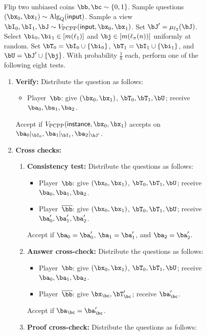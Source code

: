 \documentclass[11pt]{article}
\begin{document}
{
	\begin{figure}Flip two unbiased coins $\bb, \bc \sim \{0, 1\}$. 
    		Sample questions $(\bx_0, \bx_1) \sim \mathrm{Alg}_{\mathrm{Q}}(\mathsf{input})$.
		Sample a view $\bI_0, \bI_1, \bJ \sim V_{\mathrm{PCPP}}(\mathsf{input}, \bx_0, \bx_1)$.
		Set $\bJ' = \mu_{\ell_2}(\bJ)$.
		Select $\bi_0, \bi_1 \in [m(\ell_1)]$ and $\bj \in [m(\ell_\pi(n))]$ uniformly at random.
		Set $\bT_0 = \bI_0 \cup \{\bi_0\}$, $\bT_1 = \bI_1 \cup \{\bi_1\}$, and $\bU = \bJ' \cup \{\bj\}$.
	With probability $\frac{1}{8}$ each, perform one of the following eight tests.
	\begin{enumerate}
	\item \textbf{Verify:}
		Distribute the question as follows:
			\begin{itemize}
			\item[$\circ$] Player~$\bb$: give $(\bx_0, \bx_1)$, $\bT_0, \bT_1, \bU$; receive $\ba_0, \ba_1, \ba_2$.
			\end{itemize}
		Accept if $V_{\mathrm{PCPP}}(\mathsf{instance}, \bx_0, \bx_1)$ accepts on $\ba_0|_{\bI_0}, \ba_1|_{\bI_1}, \ba_2|_{\bJ'}$.
	\item \textbf{Cross checks:}
	\begin{enumerate}
	\item \textbf{Consistency test:} Distribute the questions as follows:
			\begin{itemize}
			\item[$\circ$] Player~$\bb$: give $(\bx_0, \bx_1)$, $\bT_0, \bT_1, \bU$; receive $\ba_0, \ba_1, \ba_2$.
			\item[$\circ$] Player~$\overline{\bb}$: give $(\bx_0, \bx_1)$, $\bT_0, \bT_1, \bU$; receive $\ba_0', \ba_1', \ba_2'$.
			\end{itemize}
		Accept if $\ba_0 = \ba_0'$, $\ba_1 = \ba_1'$, and $\ba_2 = \ba_2'$.
	\item \textbf{Answer cross-check:} Distribute the questions as follows:
			\begin{itemize}
			\item[$\circ$] Player~$\bb$: give $(\bx_0, \bx_1)$, $\bT_0, \bT_1, \bU$; receive $\ba_0, \ba_1, \ba_2$.
			\item[$\circ$] Player~$\overline{\bb}$: give $\bx_{\bc}, \bT_{\bc}'$; receive $\ba_{\bc}'$.
			\end{itemize}
		Accept if $\ba_{\bc} = \ba_{\bc}'$.
	\item \textbf{Proof cross-check:} Distribute the questions as follows:
			\begin{itemize}

\end{itemize}
\end{enumerate}
\end{enumerate}
\end{figure}}
\end{document}
